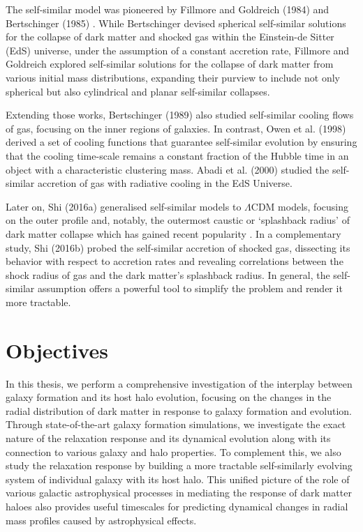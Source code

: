 The self-similar model was pioneered by Fillmore and Goldreich (1984) \cite{1984FillmoreGoldreich} and Bertschinger (1985) \cite{1985Bertschinger}. While Bertschinger devised spherical self-similar solutions for the collapse of dark matter and shocked gas within the Einstein-de Sitter (EdS) universe, under the assumption of a constant accretion rate, Fillmore and Goldreich explored self-similar solutions for the collapse of dark matter from various initial mass distributions, expanding their purview to include not only spherical but also cylindrical and planar self-similar collapses. 

Extending those works, Bertschinger (1989) \citep{1989Bertschinger} also studied self-similar cooling flows of gas, focusing on the inner regions of galaxies. In contrast, Owen et al. (1998) \citep{1998OwenWeinberg_etal} derived a set of cooling functions that guarantee self-similar evolution by ensuring that the cooling time-scale remains a constant fraction of the Hubble time in an object with a characteristic clustering mass. Abadi et al. (2000) \citep{2000Abadi_etal_SelfSimCool} studied the self-similar accretion of gas with radiative cooling in the EdS Universe.

Later on, Shi (2016a) \cite{2016ShiDMLamCDM} generalised self-similar models to $\Lambda$CDM models, focusing on the outer profile and, notably, the outermost caustic or `splashback radius' of dark matter collapse which has gained recent popularity \cite{2014DiemerKrastov,2014AdhikariDalalChamberlain,2018Changetal_DES_splashback}.
In a complementary study, Shi (2016b) \cite{2016ShiICM} probed the self-similar accretion of shocked gas, dissecting its behavior with respect to accretion rates and revealing correlations between the shock radius of gas and the dark matter's splashback radius. In general, the self-similar assumption offers a powerful tool to simplify the problem and render it more tractable.



\section{Objectives}

In this thesis, we perform a comprehensive investigation of the interplay between galaxy formation and its host halo evolution, focusing on the changes in the radial distribution of dark matter in response to galaxy formation and evolution. Through state-of-the-art galaxy formation simulations, we investigate the exact nature of the relaxation response and its dynamical evolution along with its connection to various galaxy and halo properties. To complement this, we also study the relaxation response by building a more tractable self-similarly evolving system of individual galaxy with its host halo. This unified picture of the role of various galactic astrophysical processes in mediating the response of dark matter haloes also provides useful timescales for predicting dynamical changes in radial mass profiles caused by astrophysical effects.

